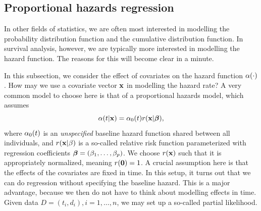 \subsection{Proportional hazards regression}\label{subsec:ph-reg}
In other fields of statistics, we are often most interested in modelling the probability distribution function
and the cumulative distribution function.
In survival analysis, however, we are typically more interested in modelling the hazard function. The reasons for this will become clear in a minute.

In this subsection, we consider the effect of covariates on the hazard function $\alpha(\cdot)$. How may we use a covariate vector $\mathbf{x}$ in modelling the hazard rate? A very common model to choose here is that of a proportional hazards model, which assumes
\begin{equation}\label{eq:PH}
    \alpha(t|\mathbf{x})=\alpha_0(t)r(\mathbf{x}|\boldsymbol{\beta}),
\end{equation}
where $\alpha_0(t)$ is an \textit{unspecified} baseline hazard function shared between all individuals, and $r(\mathbf{x}|\beta)$ is a so-called relative risk function parameterized with regression coefficients $\boldsymbol{\beta}=(\beta_1,\ldots,\beta_p)$. We choose $r(\mathbf{x})$ such that it is appropriately normalized, meaning $r(\mathbf{0})=1$.
A crucial assumption here is that the effects of the covariates are fixed in time. In this setup, it turns out that we can do regression without specifying the baseline hazard. This is a major advantage, because we then do not have to think about modelling effects in time. Given data $D=(t_i,d_i),i=1,\ldots,n$, we may set up a so-called partial likelihood.

